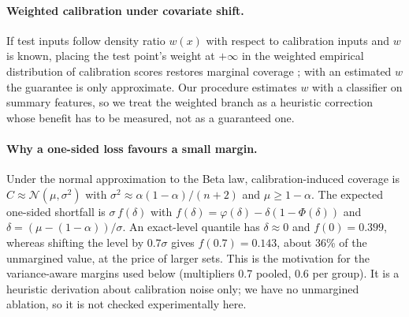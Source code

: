 \documentclass{article}
\begin{document}
\paragraph{Weighted calibration under covariate shift.}
If test inputs follow density ratio $w(x)$ with respect to calibration inputs and $w$ is known, placing the test point's weight at $+\infty$ in the weighted empirical distribution of calibration scores restores marginal coverage \citep{Tibshirani2019Conformal}; with an estimated $w$ the guarantee is only approximate. Our procedure estimates $w$ with a classifier on summary features, so we treat the weighted branch as a heuristic correction whose benefit has to be measured, not as a guaranteed one.

\paragraph{Why a one-sided loss favours a small margin.}
Under the normal approximation to the Beta law, calibration-induced coverage is $C\approx\mathcal N(\mu,\sigma^2)$ with $\sigma^2\approx\alpha(1-\alpha)/(n+2)$ and $\mu\ge1-\alpha$. The expected one-sided shortfall is $\sigma\,f(\delta)$ with $f(\delta)=\varphi(\delta)-\delta(1-\Phi(\delta))$ and $\delta=(\mu-(1-\alpha))/\sigma$. An exact-level quantile has $\delta\approx0$ and $f(0)=0.399$, whereas shifting the level by $0.7\sigma$ gives $f(0.7)=0.143$, about 36\% of the unmargined value, at the price of larger sets. This is the motivation for the variance-aware margins used below (multipliers 0.7 pooled, 0.6 per group). It is a heuristic derivation about calibration noise only; we have no unmargined ablation, so it is not checked experimentally here.
\end{document}
